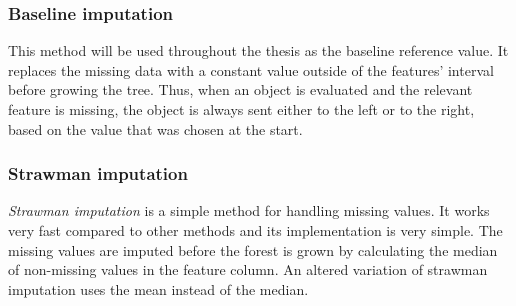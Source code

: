 \documentclass[11pt]{article}
\begin{document}
      \subsubsection{Baseline imputation}
        \label{sec:baseline}
        This method will be used throughout the thesis as the baseline reference value. It replaces the missing data with a constant value outside of the features' interval before growing the tree. Thus, when an object is evaluated and the relevant feature is missing, the object is always sent either to the left or to the right, based on the value that was chosen at the start.
      \subsubsection{Strawman imputation}
        \label{sec:strawman}
        {\it Strawman imputation}\cite{otfi} is a simple method for handling missing values. It works very fast compared to other methods and its implementation is very simple. The missing values are imputed before the forest is grown by calculating the median of non-missing values in the feature column. An altered variation of strawman imputation uses the mean instead of the median.
\end{document}
